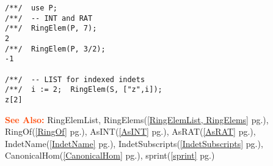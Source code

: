 \documentclass[a4paper]{mybook}
\newenvironment{command}{}{} %
\newcommand\SeeAlso{\par\textcolor{OrangeRed}{\textbf{\large See Also: }}}
\begin{document}
\begin{command}
\begin{Verbatim}[label=example, rulecolor=\color{PineGreen}, frame=single]
/**/  use P;
/**/  -- INT and RAT
/**/  RingElem(P, 7);
2
/**/  RingElem(P, 3/2);
-1

/**/  -- LIST for indexed indets
/**/  i := 2;  RingElem(S, ["z",i]); 
z[2]
\end{Verbatim}


\SeeAlso %
  RingElemList, RingElems(\ref{RingElemList, RingElems} pg.\pageref{RingElemList, RingElems}), 
    RingOf(\ref{RingOf} pg.\pageref{RingOf}), 
    AsINT(\ref{AsINT} pg.\pageref{AsINT}), 
    AsRAT(\ref{AsRAT} pg.\pageref{AsRAT}), 
    IndetName(\ref{IndetName} pg.\pageref{IndetName}), 
    IndetSubscripts(\ref{IndetSubscripts} pg.\pageref{IndetSubscripts}), 
    CanonicalHom(\ref{CanonicalHom} pg.\pageref{CanonicalHom}), 
    sprint(\ref{sprint} pg.\pageref{sprint})
\end{command} %
\end{document}

